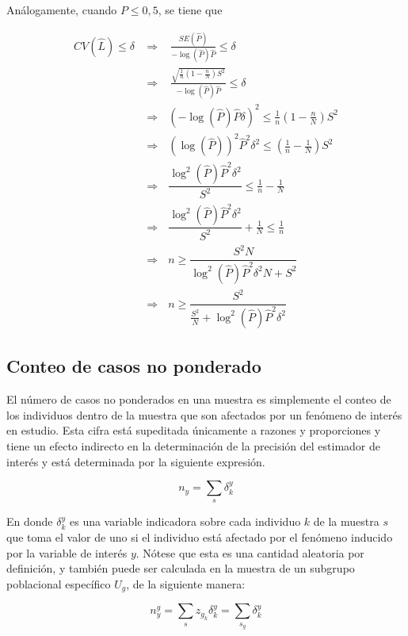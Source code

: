\documentclass[12pt,spanish,]{book}
\begin{document}
Análogamente, cuando \(P \leq 0,5\), se tiene que

\begin{align*}
CV(\hat{L}) \leq \delta
&\Longrightarrow \ \ \ \ 
\frac{SE(\hat{P})}{-\log(\hat{P})\hat{P}} \leq \delta \\
&\Longrightarrow \ \ \ \ 
\frac{\sqrt{\frac{1}{n}(1-\frac{n}{N})S^2}}{-\log(\hat{P})\hat{P}}\leq \delta \\
&\Longrightarrow \ \ \ 
(-\log (\hat{P})\hat{P}\delta)^2 \leq \frac{1}{n}(1-\frac{n}{N})S^2 \\
&\Longrightarrow \ \ \ 
(\log (\hat{P}))^2\hat{P}^2\delta^2 \leq (\frac{1}{n}-\frac{1}{N})S^2 \\
&\Longrightarrow \ \ \ 
\dfrac{\log^2(\hat{P})\hat{P}^2\delta^2}{S^2} \leq \frac{1}{n} - \frac{1}{N} \\
&\Longrightarrow \ \ \ 
\dfrac{\log^2(\hat{P})\hat{P}^2\delta^2}{S^2} + \frac{1}{N} \leq \frac{1}{n} \\ 
&\Longrightarrow \ \ \ 
n \geq \dfrac{S^2N}{\log^2(\hat{P})\hat{P}^2\delta^2N + S^2}\\
&\Longrightarrow \ \ \ 
n \geq \dfrac{S^2}{\frac{S^2}{N}+\log^2(\hat{P})\hat{P}^2\delta^2}
\end{align*}

\hypertarget{conteo-de-casos-no-ponderado}{%
\subsection{Conteo de casos no ponderado}\label{conteo-de-casos-no-ponderado}}

El número de casos no ponderados en una muestra es simplemente el conteo de los individuos dentro de la muestra que son afectados por un fenómeno de interés en estudio. Esta cifra está supeditada únicamente a razones y proporciones y tiene un efecto indirecto en la determinación de la precisión del estimador de interés y está determinada por la siguiente expresión.

\[
n_y = \sum_{s}\delta_{k}^y
\]

En donde \(\delta_{k}^y\) es una variable indicadora sobre cada individuo \(k\) de la muestra \(s\) que toma el valor de uno si el individuo está afectado por el fenómeno inducido por la variable de interés \(y\). Nótese que esta es una cantidad aleatoria por definición, y también puede ser calculada en la muestra de un subgrupo poblacional específico \(U_g\), de la siguiente manera:

\[
n_y^g = \sum_{s}z_{g_k}\delta_{k}^y = \sum_{s_g}\delta_{k}^y
\]
\end{document}
